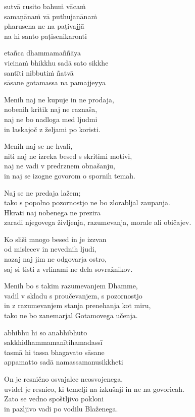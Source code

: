sutvā rusito bahuṁ vācaṁ\\
samaṇānaṁ vā puthujanānaṁ\\
pharusena ne na paṭivajjā\\
na hi santo paṭisenikaronti

etañca dhammamaññāya\\
vicinaṁ bhikkhu sadā sato sikkhe\\
santīti nibbutiṁ ñatvā\\
sāsane gotamassa na pamajjeyya


\clearpage

Menih naj ne kupuje in ne prodaja,\\
nobenih kritik naj ne raznaša,\\
naj ne bo nadloga med ljudmi\\
in laskajoč z željami po koristi.

Menih naj se ne hvali,\\
niti naj ne izreka besed s skritimi motivi,\\
naj ne vadi v predrznem obnašanju,\\
in naj se izogne govorom o spornih temah.

Naj se ne predaja lažem;\\
tako s popolno pozornostjo ne bo zlorabljal zaupanja.\\
Hkrati naj nobenega ne prezira\\
zaradi njegovega življenja, razumevanja, morale ali običajev.

Ko sliši mnogo besed in je izzvan\\
od mislecev in nevednih ljudi,\\
nazaj naj jim ne odgovarja ostro,\\
saj si tisti z vrlinami ne dela sovražnikov.

Menih bo s takim razumevanjem Dhamme,\\
vadil v skladu s proučevanjem, s pozornostjo\\
in z razumevanjem stanja prenehanja kot miru,\\
tako ne bo zanemarjal Gotamovega učenja.


\clearpage

abhibhū hi so anabhibhūto\\
sakkhidhammamanītihamadassī\\
tasmā hi tassa bhagavato sāsane\\
appamatto sadā namassamanusikkheti


\clearpage

On je resnično osvajalec neosvojenega,\\
uvidel je resnico, ki temelji na izkušnji in ne na govoricah.\\
Zato se vedno spoštljivo pokloni\\
in pazljivo vadi po vodilu Blaženega.

